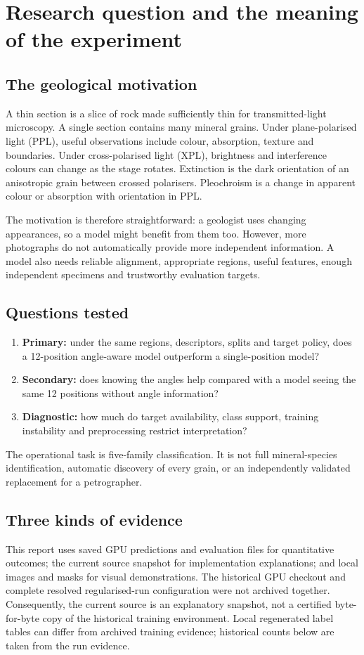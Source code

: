 \section{Research question and the meaning of the experiment}
\subsection{The geological motivation}
A thin section is a slice of rock made sufficiently thin for transmitted-light microscopy. A single section contains many mineral grains. Under plane-polarised light (PPL), useful observations include colour, absorption, texture and boundaries. Under cross-polarised light (XPL), brightness and interference colours can change as the stage rotates. Extinction is the dark orientation of an anisotropic grain between crossed polarisers. Pleochroism is a change in apparent colour or absorption with orientation in PPL.

The motivation is therefore straightforward: a geologist uses changing appearances, so a model might benefit from them too. However, more photographs do not automatically provide more independent information. A model also needs reliable alignment, appropriate regions, useful features, enough independent specimens and trustworthy evaluation targets.

\subsection{Questions tested}
\begin{enumerate}
\item \textbf{Primary:} under the same regions, descriptors, splits and target policy, does a 12-position angle-aware model outperform a single-position model?
\item \textbf{Secondary:} does knowing the angles help compared with a model seeing the same 12 positions without angle information?
\item \textbf{Diagnostic:} how much do target availability, class support, training instability and preprocessing restrict interpretation?
\end{enumerate}
The operational task is five-family classification. It is not full mineral-species identification, automatic discovery of every grain, or an independently validated replacement for a petrographer.

\subsection{Three kinds of evidence}
This report uses saved GPU predictions and evaluation files for quantitative outcomes; the current source snapshot for implementation explanations; and local images and masks for visual demonstrations. The historical GPU checkout and complete resolved regularised-run configuration were not archived together. Consequently, the current source is an explanatory snapshot, not a certified byte-for-byte copy of the historical training environment. Local regenerated label tables can differ from archived training evidence; historical counts below are taken from the run evidence.

